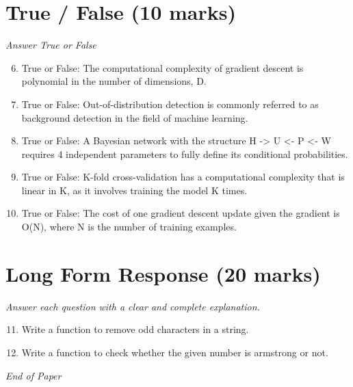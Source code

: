 \documentclass[12pt]{article}
\begin{document}
\section*{True / False (10 marks)}
\textit{Answer True or False}
\begin{enumerate}[label=\arabic*.]
\setcounter{enumi}{5}
\item True or False: The computational complexity of gradient descent is polynomial in the number of dimensions, D.
\item True or False: Out-of-distribution detection is commonly referred to as background detection in the field of machine learning.
\item True or False: A Bayesian network with the structure H -\textgreater{} U \textless{}- P \textless{}- W requires 4 independent parameters to fully define its conditional probabilities.
\item True or False: K-fold cross-validation has a computational complexity that is linear in K, as it involves training the model K times.
\item True or False: The cost of one gradient descent update given the gradient is O(N), where N is the number of training examples.
\end{enumerate}

\section*{Long Form Response (20 marks)}
\textit{Answer each question with a clear and complete explanation.}
\begin{enumerate}[label=\arabic*.]
\setcounter{enumi}{10}
\item Write a function to remove odd characters in a string.
\item Write a function to check whether the given number is armstrong or not.
\end{enumerate}

\vfill
\noindent\textit{End of Paper}
\end{document}
